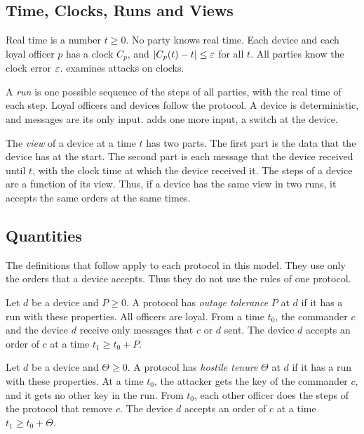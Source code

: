 \subsection{Time, Clocks, Runs and Views}

Real time is a number $t \ge 0$. No party knows real time. Each device and each loyal
officer $p$ has a clock $C_p$, and $|C_p(t) - t| \le \varepsilon$ for all $t$. All parties know
the clock error $\varepsilon$.  examines attacks on clocks.

A \emph{run} is one possible sequence of the steps of all parties, with the real time of
each step. Loyal officers and devices follow the protocol. A device is deterministic, and
messages are its only input.  adds one more input, a switch at the
device.

The \emph{view} of a device at a time $t$ has two parts. The first part is the data that
the device has at the start. The second part is each message that the device received
until $t$, with the clock time at which the device received it. The steps of a device are
a function of its view. Thus, if a device has the same view in two runs, it accepts the
same orders at the same times.

\subsection{Quantities}
\label{sec:quantities}

The definitions that follow apply to each protocol in this model. They use only the orders
that a device accepts. Thus they do not use the rules of one protocol.

\begin{dfn}
\label{def:tolerance}
Let $d$ be a device and $P \ge 0$. A protocol has \emph{outage tolerance} $P$ at $d$ if it
has a run with these properties. All officers are loyal. From a time $t_0$, the commander
$c$ and the device $d$ receive only messages that $c$ or $d$ sent. The device $d$ accepts an
order of $c$ at a time $t_1 \ge t_0 + P$.
\end{dfn}

\begin{dfn}
\label{def:tenure}
Let $d$ be a device and $\Theta \ge 0$. A protocol has \emph{hostile tenure} $\Theta$ at
$d$ if it has a run with these properties. At a time $t_0$, the attacker gets the key of
the commander $c$, and it gets no other key in the run. From $t_0$, each other officer does
the steps of the protocol that remove $c$. The device $d$ accepts an order of $c$ at a time
$t_1 \ge t_0 + \Theta$.
\end{dfn}

